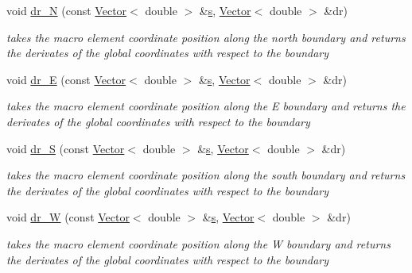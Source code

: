 \begin{DoxyCompactItemize}
void \hyperlink{classoomph_1_1TopologicallyRectangularDomain_ad37cd9d2ee8eb90125d66be63d5b97c7}{dr\+\_\+N} (const \hyperlink{classoomph_1_1Vector}{Vector}$<$ double $>$ \&\hyperlink{cfortran_8h_ab7123126e4885ef647dd9c6e3807a21c}{s}, \hyperlink{classoomph_1_1Vector}{Vector}$<$ double $>$ \&dr)
\begin{DoxyCompactList}\small\item\em takes the macro element coordinate position along the north boundary and returns the derivates of the global coordinates with respect to the boundary \end{DoxyCompactList}\item 
void \hyperlink{classoomph_1_1TopologicallyRectangularDomain_a22b9364ef22563bea32aad2ff9e6851f}{dr\+\_\+E} (const \hyperlink{classoomph_1_1Vector}{Vector}$<$ double $>$ \&\hyperlink{cfortran_8h_ab7123126e4885ef647dd9c6e3807a21c}{s}, \hyperlink{classoomph_1_1Vector}{Vector}$<$ double $>$ \&dr)
\begin{DoxyCompactList}\small\item\em takes the macro element coordinate position along the E boundary and returns the derivates of the global coordinates with respect to the boundary \end{DoxyCompactList}\item 
void \hyperlink{classoomph_1_1TopologicallyRectangularDomain_a24a20bc9749166ca61bd4373bc381680}{dr\+\_\+S} (const \hyperlink{classoomph_1_1Vector}{Vector}$<$ double $>$ \&\hyperlink{cfortran_8h_ab7123126e4885ef647dd9c6e3807a21c}{s}, \hyperlink{classoomph_1_1Vector}{Vector}$<$ double $>$ \&dr)
\begin{DoxyCompactList}\small\item\em takes the macro element coordinate position along the south boundary and returns the derivates of the global coordinates with respect to the boundary \end{DoxyCompactList}\item 
void \hyperlink{classoomph_1_1TopologicallyRectangularDomain_a91b92399343513aed5cfa65a8377b01a}{dr\+\_\+W} (const \hyperlink{classoomph_1_1Vector}{Vector}$<$ double $>$ \&\hyperlink{cfortran_8h_ab7123126e4885ef647dd9c6e3807a21c}{s}, \hyperlink{classoomph_1_1Vector}{Vector}$<$ double $>$ \&dr)
\begin{DoxyCompactList}\small\item\em takes the macro element coordinate position along the W boundary and returns the derivates of the global coordinates with respect to the boundary \end{DoxyCompactList}\item 

\end{DoxyCompactItemize}
